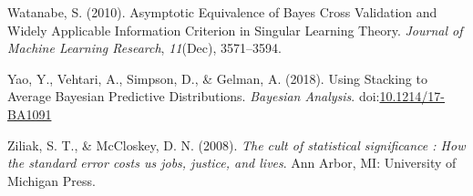 \documentclass[doc]{apa6}
\begin{document}
\hypertarget{ref-WatanabeAsymptoticEquivalenceBayes2010}{}
Watanabe, S. (2010). Asymptotic Equivalence of Bayes Cross Validation
and Widely Applicable Information Criterion in Singular Learning Theory.
\emph{Journal of Machine Learning Research}, \emph{11}(Dec), 3571--3594.

\hypertarget{ref-YaoUsingStackingAverage2018}{}
Yao, Y., Vehtari, A., Simpson, D., \& Gelman, A. (2018). Using Stacking
to Average Bayesian Predictive Distributions. \emph{Bayesian Analysis}.
doi:\href{https://doi.org/10.1214/17-BA1091}{10.1214/17-BA1091}

\hypertarget{ref-ziliakCultStatisticalSignificance2008}{}
Ziliak, S. T., \& McCloskey, D. N. (2008). \emph{The cult of statistical
significance : How the standard error costs us jobs, justice, and
lives}. Ann Arbor, MI: University of Michigan Press.

\endgroup
\end{document}
